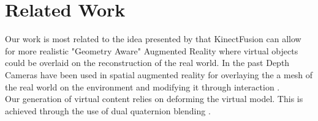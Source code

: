 \section{Related Work}
Our work is most related to the idea presented by \cite{izadi2011kinectfusion} that KinectFusion can allow for more realistic "Geometry Aware" Augmented Reality where virtual objects could be overlaid on the reconstruction of the real world. In the past Depth Cameras have been used in spatial augmented  reality for overlaying the a mesh of the real world on the environment and modifying it through interaction \cite{wilson2010combining}.\\
Our generation of virtual content relies on deforming the virtual model. This is achieved through the use of dual quaternion blending \cite{kavan2008geometric}.